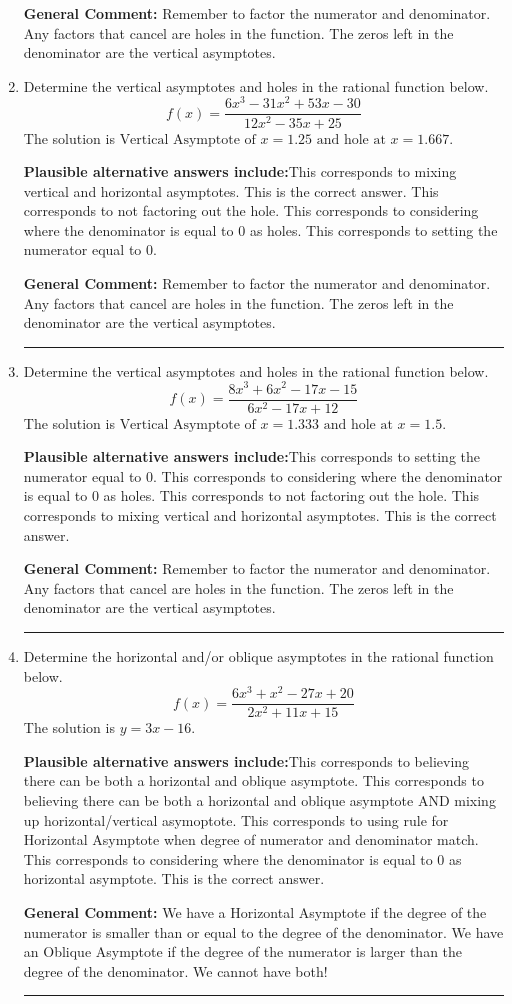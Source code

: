 \documentclass{extbook}[14pt]
\newcommand{\litem}[1]{\item #1

\rule{\textwidth}{0.4pt}}
\begin{document}
\begin{enumerate}
{\textbf{General Comment:} Remember to factor the numerator and denominator. Any factors that cancel are holes in the function. The zeros left in the denominator are the vertical asymptotes.
}
\litem{
Determine the vertical asymptotes and holes in the rational function below.
\[ f(x) = \frac{6x^{3} -31 x^{2} +53 x -30}{12x^{2} -35 x + 25} \]The solution is \( \text{Vertical Asymptote of } x = 1.25 \text{ and hole at } x = 1.667 \).\begin{enumerate}[label=\Alph*.]
\textbf{Plausible alternative answers include:}This corresponds to mixing vertical and horizontal asymptotes.
This is the correct answer.
This corresponds to not factoring out the hole.
This corresponds to considering where the denominator is equal to 0 as holes.
This corresponds to setting the numerator equal to 0.
\end{enumerate}

\textbf{General Comment:} Remember to factor the numerator and denominator. Any factors that cancel are holes in the function. The zeros left in the denominator are the vertical asymptotes.
}
\litem{
Determine the vertical asymptotes and holes in the rational function below.
\[ f(x) = \frac{8x^{3} +6 x^{2} -17 x -15}{6x^{2} -17 x + 12} \]The solution is \( \text{Vertical Asymptote of } x = 1.333 \text{ and hole at } x = 1.5 \).\begin{enumerate}[label=\Alph*.]
\textbf{Plausible alternative answers include:}This corresponds to setting the numerator equal to 0.
This corresponds to considering where the denominator is equal to 0 as holes.
This corresponds to not factoring out the hole.
This corresponds to mixing vertical and horizontal asymptotes.
This is the correct answer.
\end{enumerate}

\textbf{General Comment:} Remember to factor the numerator and denominator. Any factors that cancel are holes in the function. The zeros left in the denominator are the vertical asymptotes.
}
\litem{
Determine the horizontal and/or oblique asymptotes in the rational function below.
\[ f(x) = \frac{6x^{3} + x^{2} -27 x + 20}{2x^{2} +11 x + 15} \]The solution is \( y = 3x -16 \).\begin{enumerate}[label=\Alph*.]
\textbf{Plausible alternative answers include:}This corresponds to believing there can be both a horizontal and oblique asymptote.
This corresponds to believing there can be both a horizontal and oblique asymptote AND mixing up horizontal/vertical asymoptote.
This corresponds to using rule for Horizontal Asymptote when degree of numerator and denominator match.
This corresponds to considering where the denominator is equal to 0 as horizontal asymptote.
This is the correct answer.
\end{enumerate}

\textbf{General Comment:} We have a Horizontal Asymptote if the degree of the numerator is smaller than or equal to the degree of the denominator. We have an Oblique Asymptote if the degree of the numerator is larger than the degree of the denominator. We cannot have both!
}
\end{enumerate}
\end{document}
